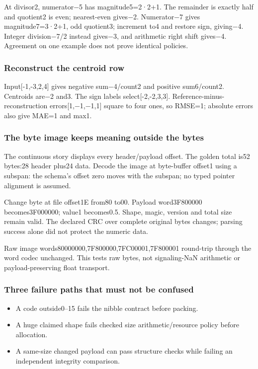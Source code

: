 At divisor2, numerator−5 has magnitude5=2·2+1. The remainder is exactly half and quotient2 is even; nearest-even gives−2. Numerator−7 gives magnitude7=3·2+1, odd quotient3; increment to4 and restore sign, giving−4. Integer division−7/2 instead gives−3, and arithmetic right shift gives−4. Agreement on one example does not prove identical policies.

\subsubsection{Reconstruct the centroid row}\label{appendix-92ff77d4dfdc-reconstruct-the-centroid-row}

Input{[}-1,-3,2,4{]} gives negative sum−4/count2 and positive sum6/count2. Centroids are−2 and3. The sign labels select{[}-2,-2,3,3{]}. Reference-minus-reconstruction errors{[}1,−1,−1,1{]} square to four ones, so RMSE=1; absolute errors also give MAE=1 and max1.

\subsubsection{The byte image keeps meaning outside the bytes}\label{appendix-92ff77d4dfdc-the-byte-image-keeps-meaning-outside-the-bytes}

The continuous story displays every header/payload offset. The golden total is52 bytes:28 header plus24 data. Decode the image at byte-buffer offset1 using a subspan: the schema's offset zero moves with the subspan; no typed pointer alignment is assumed.

Change byte at file offset1E from80 to00. Payload word3F800000 becomes3F000000; value1 becomes0.5. Shape, magic, version and total size remain valid. The declared CRC over complete original bytes changes; parsing success alone did not protect the numeric data.

Raw image words80000000,7F800000,7FC00001,7F800001 round-trip through the word codec unchanged. This tests raw bytes, not signaling-NaN arithmetic or payload-preserving float transport.

\subsubsection{Three failure paths that must not be confused}\label{appendix-92ff77d4dfdc-three-failure-paths-that-must-not-be-confused}

\begin{itemize}
\tightlist
\item
  A code outside0--15 fails the nibble contract before packing.
\item
  A huge claimed shape fails checked size arithmetic/resource policy before allocation.
\item
  A same-size changed payload can pass structure checks while failing an independent integrity comparison.
\end{itemize}

